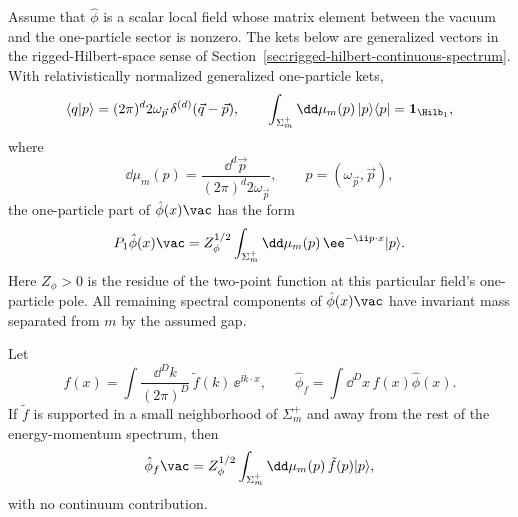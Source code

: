 \begin{proposition}
\label{prop:hr-point-field-isolated-shell-projection}
Assume that \(\hat\phi\) is a scalar local field whose matrix element between
the vacuum and the one-particle sector is nonzero.  The kets below are
generalized vectors in the rigged-Hilbert-space sense of
Section~\ref{sec:rigged-hilbert-continuous-spectrum}. With relativistically
normalized generalized one-particle kets,
\[
  \langle q|p\rangle
  =
  (2\pi)^d2\omega_{\vec p}\,\delta^{(d)}(\vec q-\vec p),
  \qquad
  \int_{\Sigma_m^+}\dd\mu_m(p)\,|p\rangle\langle p|=\mathbf 1_{\Hilb_1},
\]
where
\[
  \dd\mu_m(p)
  =
  \frac{\dd^d\vec p}{(2\pi)^d2\omega_{\vec p}},
  \qquad
  p=(\omega_{\vec p},\vec p),
\]
the one-particle part of \(\hat\phi(x)\vac\) has the form
\[
  P_1\hat\phi(x)\vac
  =
  Z_\phi^{1/2}
  \int_{\Sigma_m^+}\dd\mu_m(p)\,
  \ee^{-\ii p\cdot x}|p\rangle .
\]
Here \(Z_\phi>0\) is the residue of the two-point function at this particular
field's one-particle pole.  All remaining spectral components of
\(\hat\phi(x)\vac\) have invariant mass separated from \(m\) by the assumed
gap.

Let
\[
  f(x)=\int\frac{\dd^D k}{(2\pi)^D}\,\tilde f(k)\,\ee^{\ii k\cdot x},
  \qquad
  \hat\phi_f=\int\dd^D x\,f(x)\hat\phi(x).
\]
If \(\tilde f\) is supported in a small neighborhood of \(\Sigma_m^+\) and away
from the rest of the energy-momentum spectrum, then
\[
  \hat\phi_f\vac
  =
  Z_\phi^{1/2}
  \int_{\Sigma_m^+}\dd\mu_m(p)\,
  \tilde f(p)|p\rangle ,
\]
with no continuum contribution.
\end{proposition}


